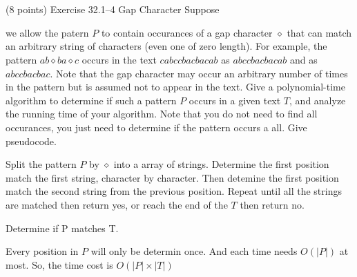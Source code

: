 \documentclass[paper=a4, fontsize=11pt]{scrartcl} %
\begin{document}
\section{}

\begin{fancyquotes}
   (8 points) Exercise 32.1--4 Gap Character Suppose

   we allow the patern $P$ to contain occurances of a gap character
   $\diamond$ that can match an arbitrary string of characters (even
   one of zero length). For example, the pattern $ab\diamond
   ba\diamond c$ occurs in the text $cabccbacbacab$ as $abccbacbacab$
   and as $abccbacbac$. Note that the gap character may occur an
   arbitrary number of times in the pattern but is assumed not to
   appear in the text. Give a polynomial-time algorithm to determine
   if such a pattern $P$ occurs in a given text $T$, and analyze the
   running time of your algorithm. Note that you do not need to find
   all occurances, you just need to determine if the pattern occurs a
   all. Give pseudocode.
\end{fancyquotes}

Split the pattern $P$ by $\diamond$ into a array of strings.
Determine the first position match the first string, character by character.
Then detemine the first position match the second string from the
previous position.
Repeat until all the strings are matched then return yes, or reach the
end of the $T$ then return no.

\begin{algorithm}[H]
  \caption{Determine if P matches T.}
\end{algorithm}

Every position in $P$ will only be determin once.
And each time needs $O(|P|)$ at most.
So, the time cost is $O(|P|\times |T|)$

\pagebreak

\section{}
\end{document}
